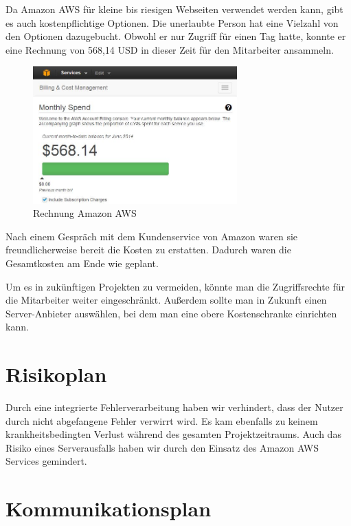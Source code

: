 \documentclass{article}
\begin{document}
Da Amazon AWS für kleine bis riesigen Webseiten verwendet werden kann, gibt es auch kostenpflichtige Optionen. Die unerlaubte Person hat eine Vielzahl von den Optionen dazugebucht. Obwohl er nur Zugriff für einen Tag hatte, konnte er eine Rechnung von 568,14 USD in dieser Zeit für den Mitarbeiter ansammeln.

\begin{figure}[H]
    \centering
    \includegraphics[width=0.7\textwidth]{images/amazon-bill.jpg}
    \caption{Rechnung Amazon AWS}
    \label{fig:bill}
\end{figure}

\noindent Nach einem Gespräch mit dem Kundenservice von Amazon waren sie freundlicherweise bereit die Kosten zu erstatten. Dadurch waren die Gesamtkosten am Ende wie geplant.

Um es in zukünftigen Projekten zu vermeiden, könnte man die Zugriffsrechte für die Mitarbeiter weiter eingeschränkt. Außerdem sollte man in Zukunft einen Server-Anbieter auswählen, bei dem man eine obere Kostenschranke einrichten kann.

\section{Risikoplan}

Durch eine integrierte Fehlerverarbeitung haben wir verhindert, dass der Nutzer durch nicht abgefangene Fehler verwirrt wird. Es kam ebenfalls zu keinem krankheitsbedingten Verlust während des gesamten Projektzeitraums. Auch das Risiko eines Serverausfalls haben wir durch den Einsatz des Amazon AWS Services gemindert.

\section{Kommunikationsplan}
\end{document}
